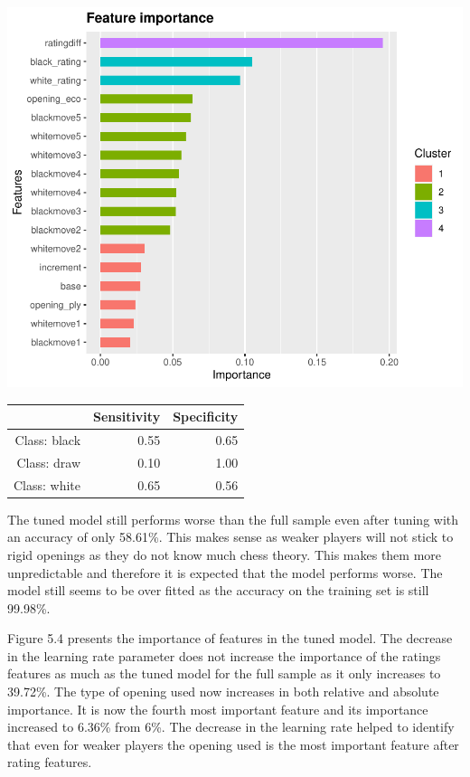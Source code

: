 \documentclass[12pt,preprint, authoryear]{elsarticle}
\let\origfigure\figure
\let\endorigfigure\endfigure
\renewenvironment{figure}[1][2] {
    \expandafter\origfigure\expandafter[H]
} {
    \endorigfigure
}
\let\origtable\table
\let\endorigtable\endtable
\renewenvironment{table}[1][2] {
    \expandafter\origtable\expandafter[H]
} {
    \endorigtable
}
\numberwithin{equation}{section}
\numberwithin{figure}{section}
\numberwithin{table}{section}
\begin{document}
\begin{figure}[H]

{\centering \includegraphics{WriteUp_files/figure-latex/importancelow2-1} 

}

\caption{Feature Importance Tuned Model: Bottom Half\label{Figure12}}\label{fig:importancelow2}
\end{figure}

\begin{table}[ht]
\centering
\begin{tabular}{rrr}
  \hline
 & Sensitivity & Specificity \\ 
  \hline
Class: black & 0.55 & 0.65 \\ 
  Class: draw & 0.10 & 1.00 \\ 
  Class: white & 0.65 & 0.56 \\ 
   \hline
\end{tabular}
\caption{Accuracy Bottom Sample: Tuned Model} 
\end{table}

The tuned model still performs worse than the full sample even after
tuning with an accuracy of only 58.61\%. This makes sense as weaker
players will not stick to rigid openings as they do not know much chess
theory. This makes them more unpredictable and therefore it is expected
that the model performs worse. The model still seems to be over fitted
as the accuracy on the training set is still 99.98\%.

Figure 5.4 presents the importance of features in the tuned model. The
decrease in the learning rate parameter does not increase the importance
of the ratings features as much as the tuned model for the full sample
as it only increases to 39.72\%. The type of opening used now increases
in both relative and absolute importance. It is now the fourth most
important feature and its importance increased to 6.36\% from 6\%. The
decrease in the learning rate helped to identify that even for weaker
players the opening used is the most important feature after rating
features.
\end{document}
